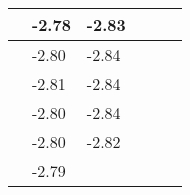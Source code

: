 \documentclass[a4paper,11pt]{report}
\begin{document}
\begin{table}[H]
\begin{center}
\begin{tabular}{|l|l|l|l|l|l|}
\hline
\hspace*{0.5cm}&\hspace*{0.5cm}-2.78&\hspace*{0.5cm}-2.83&\hspace*{0.5cm}&\hspace*{0.5cm}\\
\hline
\hspace*{0.5cm}&\hspace*{0.5cm}-2.80&\hspace*{0.5cm}-2.84&\hspace*{0.5cm}&\hspace*{0.5cm}\\
\hline
\hspace*{0.5cm}&\hspace*{0.5cm}-2.81&\hspace*{0.5cm}-2.84&\hspace*{0.5cm}&\hspace*{0.5cm}\\
\hline
\hspace*{0.5cm}&\hspace*{0.5cm}-2.80&\hspace*{0.5cm}-2.84&\hspace*{0.5cm}&\hspace*{0.5cm}\\
\hline
\hspace*{0.5cm}&\hspace*{0.5cm}-2.80&\hspace*{0.5cm}-2.82&\hspace*{0.5cm}&\hspace*{0.5cm}\\
\hline
\hspace*{0.5cm}&\hspace*{0.5cm}-2.79&\hspace*{0.5cm}&\hspace*{0.5cm}&\hspace*{0.5cm}\\
\hline
\end{tabular}
\label{table6}
\end{center}
\end{table}
\end{document}
